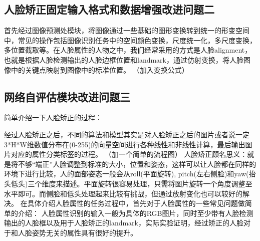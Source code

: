 \subsection{人脸矫正固定输入格式和数据增强改进问题二}
首先经过图像预测处模块，将图像通过一些基础的图形变换转到统一的形变空间中，常见的操作包括图像识别任务中的空间颜色变换，尺度统一化，多尺度变换，多位置截取等。在人脸属性的人物之中，我们经常采用的方式是人脸alignment，也就是根据人脸检测输出的人脸边框位置和landmark，通过仿射变换，将人脸图像中的关键点映射到图像中的标准位置。
（加入变换公式）


\subsection{网络自评估模块改进问题三}


简单介绍一下人脸矫正的过程：

经过人脸矫正之后，不同的算法和模型其实是对人脸矫正之后的图片或者说一定3*H*W维数值分布在(0-255)的向量空间进行各种线性和非线性计算，最后输出图片对应的属性分类标签的过程。
（加一个简单的流程图）
人脸矫正顾名思义：就是将不够“端正”人脸调整到标准的大小，位置和姿态，这样可以让人脸都在同样的环境下进行比较，人的面部姿态一般会从roll(平面旋转), pitch(左右侧脸)和yaw(抬头低头)三个维度来描述。平面旋转很容易处理，只需将图片旋转一个角度调整至水平即可。而侧脸和低头处理起来比较有挑战，但通过放射变化也可以较好的解决。
在具体介绍人脸属性的任务过程中，首先对于人脸属性的一些常见问题做简单的介绍：
人脸属性识别的输入一般为具体的RGB图片，同时至少带有人脸检测输出的人脸框以及用于人脸矫正的landmark，实际实验证明，经过矫正的人脸对于和人脸姿势无关的属性具有很好的提升。

